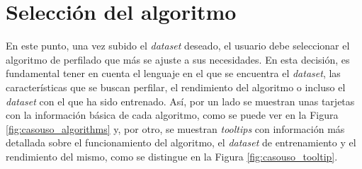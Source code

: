 \section{Selección del algoritmo}
\label{sec:casouso_algoritmo}

En este punto, una vez subido el \textit{dataset} deseado, el usuario debe seleccionar el algoritmo de perfilado que más se ajuste
a sus necesidades. En esta decisión, es fundamental tener en cuenta el lenguaje en el que se encuentra el \textit{dataset},
las características que se buscan perfilar, el rendimiento del algoritmo o incluso el \textit{dataset} con el que ha sido entrenado.
Así, por un lado se muestran unas tarjetas con la información básica de cada algoritmo, como se puede ver
en la Figura \ref{fig:casouso_algorithms} y, por otro, se muestran \textit{tooltips} con información más detallada
sobre el funcionamiento del algoritmo, el \textit{dataset} de entrenamiento y el rendimiento del mismo,
como se distingue en la Figura \ref{fig:casouso_tooltip}.

